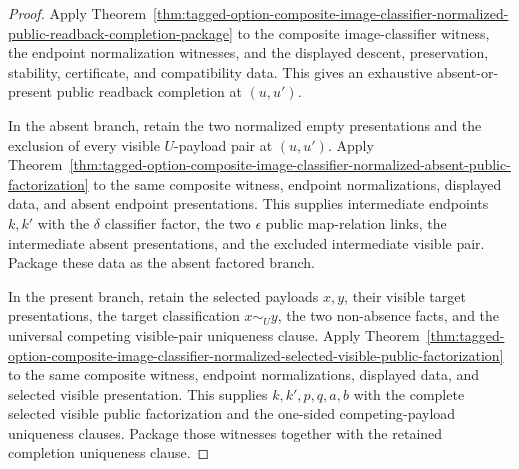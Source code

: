 \begin{proof}
Apply
Theorem~\ref{thm:tagged-option-composite-image-classifier-normalized-public-readback-completion-package}
to the composite image-classifier witness, the endpoint normalization witnesses,
and the displayed descent, preservation, stability, certificate, and
compatibility data. This gives an exhaustive absent-or-present public readback
completion at $(u,u')$.

In the absent branch, retain the two normalized empty presentations and the
exclusion of every visible $U$-payload pair at $(u,u')$. Apply
Theorem~\ref{thm:tagged-option-composite-image-classifier-normalized-absent-public-factorization}
to the same composite witness, endpoint normalizations, displayed data, and
absent endpoint presentations. This supplies intermediate endpoints $k,k'$ with
the $\delta$ classifier factor, the two $\epsilon$ public map-relation links,
the intermediate absent presentations, and the excluded intermediate visible
pair. Package these data as the absent factored branch.

In the present branch, retain the selected payloads $x,y$, their visible target
presentations, the target classification $x\sim_U y$, the two non-absence facts,
and the universal competing visible-pair uniqueness clause. Apply
Theorem~\ref{thm:tagged-option-composite-image-classifier-normalized-selected-visible-public-factorization}
to the same composite witness, endpoint normalizations, displayed data, and
selected visible presentation. This supplies $k,k',p,q,a,b$ with the complete
selected visible public factorization and the one-sided competing-payload
uniqueness clauses. Package those witnesses together with the retained
completion uniqueness clause.
\end{proof}

